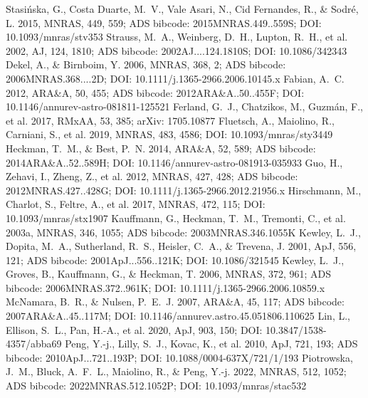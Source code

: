 \documentclass[twocolumn]{aastex631}
\begin{document}
\begin{thebibliography}{}
 Stasi{\'n}ska, G., Costa Duarte, M.~V., Vale Asari, N., Cid Fernandes, R., \& Sodr{\'e}, L. 2015, MNRAS, 449, 559; ADS bibcode: 2015MNRAS.449..559S; DOI: 10.1093/mnras/stv353
 Strauss, M.~A., Weinberg, D.~H., Lupton, R.~H., et al. 2002, AJ, 124, 1810; ADS bibcode: 2002AJ....124.1810S; DOI: 10.1086/342343
 Dekel, A., \& Birnboim, Y. 2006, MNRAS, 368, 2; ADS bibcode: 2006MNRAS.368....2D; DOI: 10.1111/j.1365-2966.2006.10145.x
 Fabian, A.~C. 2012, ARA\&A, 50, 455; ADS bibcode: 2012ARA\&A..50..455F; DOI: 10.1146/annurev-astro-081811-125521
 Ferland, G.~J., Chatzikos, M., Guzm\'an, F., et al. 2017, RMxAA, 53, 385; arXiv: 1705.10877
 Fluetsch, A., Maiolino, R., Carniani, S., et al. 2019, MNRAS, 483, 4586; DOI: 10.1093/mnras/sty3449
 Heckman, T.~M., \& Best, P.~N. 2014, ARA\&A, 52, 589; ADS bibcode: 2014ARA\&A..52..589H; DOI: 10.1146/annurev-astro-081913-035933
 Guo, H., Zehavi, I., Zheng, Z., et al. 2012, MNRAS, 427, 428; ADS bibcode: 2012MNRAS.427..428G; DOI: 10.1111/j.1365-2966.2012.21956.x
 Hirschmann, M., Charlot, S., Feltre, A., et al. 2017, MNRAS, 472, 115; DOI: 10.1093/mnras/stx1907
 Kauffmann, G., Heckman, T.~M., Tremonti, C., et al. 2003a, MNRAS, 346, 1055; ADS bibcode: 2003MNRAS.346.1055K
 Kewley, L.~J., Dopita, M.~A., Sutherland, R.~S., Heisler, C.~A., \& Trevena, J. 2001, ApJ, 556, 121; ADS bibcode: 2001ApJ...556..121K; DOI: 10.1086/321545
 Kewley, L.~J., Groves, B., Kauffmann, G., \& Heckman, T. 2006, MNRAS, 372, 961; ADS bibcode: 2006MNRAS.372..961K; DOI: 10.1111/j.1365-2966.2006.10859.x
 McNamara, B.~R., \& Nulsen, P.~E.~J. 2007, ARA\&A, 45, 117; ADS bibcode: 2007ARA\&A..45..117M; DOI: 10.1146/annurev.astro.45.051806.110625
 Lin, L., Ellison, S.~L., Pan, H.-A., et al. 2020, ApJ, 903, 150; DOI: 10.3847/1538-4357/abba69
 Peng, Y.-j., Lilly, S.~J., Kovac, K., et al. 2010, ApJ, 721, 193; ADS bibcode: 2010ApJ...721..193P; DOI: 10.1088/0004-637X/721/1/193
 Piotrowska, J.~M., Bluck, A.~F.~L., Maiolino, R., \& Peng, Y.-j. 2022, MNRAS, 512, 1052; ADS bibcode: 2022MNRAS.512.1052P; DOI: 10.1093/mnras/stac532

\end{thebibliography}
\end{document}
